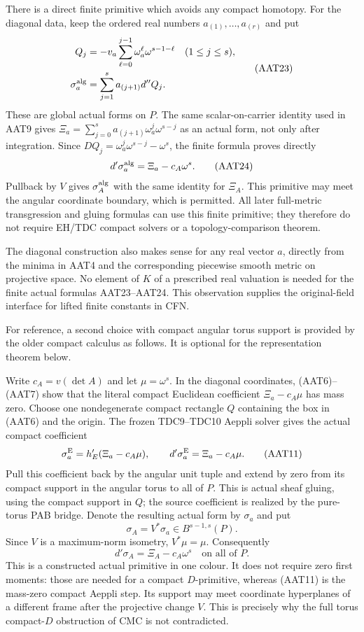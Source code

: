 There is a direct finite primitive which avoids any
compact homotopy.  For the diagonal data, keep the
ordered real numbers $a_{(1)},\ldots,a_{(r)}$ and put
\[
 \begin{split}
 Q_j&=-v_a\sum_{\ell=0}^{j-1}
                     \omega_a^\ell\omega^{s-1-\ell}
                                  \quad(1\le j\le s),\\
 \sigma_a^{\rm alg}&=\sum_{j=1}^{s}a_{(j+1)}d''Q_j.
 \end{split}
 \tag{AAT23}
\]
These are global actual forms on $P$.  The same
scalar-on-carrier identity used in AAT9 gives
$\Xi_a=\sum_{j=0}^s a_{(j+1)}\omega_a^j\omega^{s-j}$
as an actual form, not only after integration.
Since $DQ_j=\omega_a^j\omega^{s-j}-\omega^s$,
the finite formula proves directly
\[
                  d'\sigma_a^{\rm alg}=\Xi_a-c_A\omega^s.
 \tag{AAT24}
\]
Pullback by $V$ gives $\sigma_A^{\rm alg}$ with
the same identity for $\Xi_A$.  This primitive
may meet the angular coordinate boundary, which
is permitted.  All later full-metric transgression
and gluing formulas can use this finite primitive;
they therefore do not require EH/TDC compact
solvers or a topology-comparison theorem.

The diagonal construction also makes sense for
any real vector $a$, directly from the minima
in AAT4 and the corresponding piecewise smooth
metric on projective space.  No element of $K$
of a prescribed real valuation is needed for
the finite actual formulas AAT23--AAT24.  This
observation supplies the original-field interface
for lifted finite constants in CFN.

For reference, a second choice with compact
angular torus support is provided by the older
compact calculus as follows.  It is optional
for the representation theorem below.

Write $c_A=v(\det A)$ and let $\mu=\omega^s$.
In the diagonal coordinates, (AAT6)--(AAT7) show that
the literal compact Euclidean coefficient
$\Xi_a-c_A\mu$ has mass zero.  Choose one nondegenerate
compact rectangle $Q$ containing the box in (AAT6) and
the origin.  The frozen TDC9--TDC10 Aeppli solver gives
the actual compact coefficient
\[
                  \sigma_a^{\rm E}=h'_E(\Xi_a-c_A\mu),
       \qquad d'\sigma_a^{\rm E}=\Xi_a-c_A\mu.
 \tag{AAT11}
\]
Pull this coefficient back by the angular unit tuple
and extend by zero from its compact support in the
angular torus to all of $P$.  This is actual sheaf
gluing, using the compact support in $Q$; the source
coefficient is realized by the pure-torus PAB bridge.
Denote the resulting actual form by $\sigma_a$ and put
\[
                 \sigma_A=V^*\sigma_a\in B^{s-1,s}(P).
 \tag{AAT12}
\]
Since $V$ is a maximum-norm isometry, $V^*\mu=\mu$.
Consequently
\[
                      d'\sigma_A=\Xi_A-c_A\omega^s
                                      \quad\text{on all of }P.
 \tag{AAT13}
\]
This is a constructed actual primitive in one colour.
It does not require zero first moments: those are needed
for a compact $D$-primitive, whereas (AAT11) is the
mass-zero compact Aeppli step.  Its support may meet
coordinate hyperplanes of a different frame after the
projective change $V$.  This is precisely why the full
torus compact-$D$ obstruction of CMC is not contradicted.


